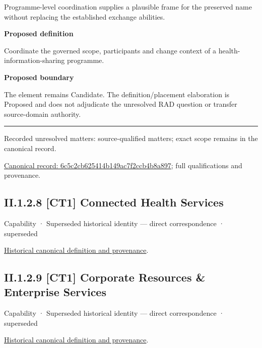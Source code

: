 Programme-level coordination supplies a plausible frame for the preserved name without replacing the established exchange abilities.



\textbf{Proposed definition}



Coordinate the governed scope, participants and change context of a health-information-sharing programme.



\textbf{Proposed boundary}



The element remains Candidate. The definition/placement elaboration is Proposed and does not adjudicate the unresolved RAD question or transfer source-domain authority.



\medskip\hrule\medskip

{\small Recorded unresolved matters: source-qualified matters; exact scope remains in the canonical record.}\par
{\footnotesize \href{../../../../continuum/strategy/capability/6c5c2cb625414b149ac7f2ccb4b8a897.md}{Canonical record: 6c5c2cb625414b149ac7f2ccb4b8a897}; full qualifications and provenance.}\par
\subsection*{II.1.2.8 [CT1] Connected Health Services}
\label{navigation:II.1.2.8}

\label{element:48f01ef8b0e6431c85cf4f40cf8f94c3}
{\small Capability · Superseded historical identity — direct correspondence · superseded}\par
\href{../../../../continuum/strategy/capability/48f01ef8b0e6431c85cf4f40cf8f94c3.md}{Historical canonical definition and provenance}.\par
\subsection*{II.1.2.9 [CT1] Corporate Resources \& Enterprise Services}
\label{navigation:II.1.2.9}

\label{element:a2dbd74847a44f4c879983229f5c9d08}
{\small Capability · Superseded historical identity — direct correspondence · superseded}\par
\href{../../../../continuum/strategy/capability/a2dbd74847a44f4c879983229f5c9d08.md}{Historical canonical definition and provenance}.\par
